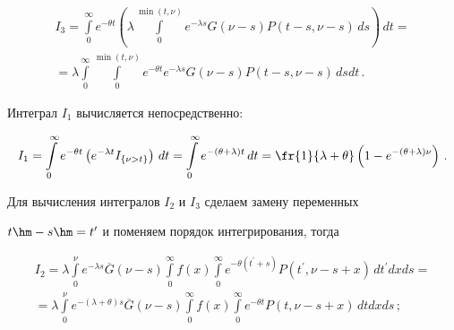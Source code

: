  

 \noindent

 \begin{multline*}

I_3=\int\limits_0^\infty e^{-\theta t} \left( \lambda \int\limits_0^{\min(t,\nu)} 

e^{-\lambda s} G(\nu-s) P(t-s,\nu-s)\,ds\right)\,dt={}\\

{}=\lambda \int\limits_0^\infty \int\limits_0^{\min(t,\nu)} e^{-\theta t} e^{-

\lambda s} G(\nu-s) P(t-s,\nu-s)\,ds dt\,.

\end{multline*}



    

    Интеграл $I_1$ вычисляется непосредственно:

    $$

    I_1=\int\limits_0^\infty e^{-\theta t}\left ( e^{-\lambda t} 

I_{\{\nu>t\}}\right)\,dt= \int\limits_0^\infty e^{-(\theta+\lambda)t}\,dt = 

\fr{1}{\lambda +\theta} \left( 1-e^{-(\theta+\lambda)\nu}\right)\,.

    $$

    

    Для вычисления интегралов  $I_2$ и $I_3$ сделаем замену переменных 

$t\hm-s\hm=t^\prime$ и поменяем порядок интегрирования, тогда

    \begin{multline*}

    I_2=\lambda \int\limits_0^\nu e^{-\lambda s} \overline{G} (\nu-s) 

\int\limits_0^\infty f(x) \int\limits_0^\infty e^{-\theta(t^\prime+s)} P(t^\prime, \nu-

s+x)\,dt^\prime dx ds={}\\

    {}=\lambda \int\limits_0^\nu e^{-(\lambda+\theta)s} \overline{G} (\nu-s) 

\int\limits_0^\infty f(x) \int\limits_0^\infty e^{-\theta t} P(t, \nu-s+x)\,dt dx 

ds\,;

    \end{multline*}

    

    \vspace*{-12pt}

